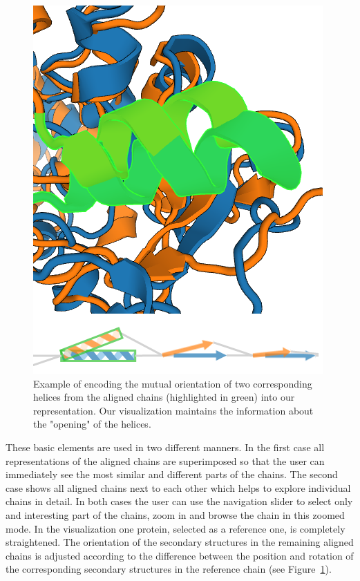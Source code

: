 \documentclass[twocolumn]{bmcart}%
\begin{document}
\begin{figure}[th]
  \centering
  \includegraphics[width=0.9\linewidth]{pics/orientation.png}
  \caption{Example of encoding the mutual orientation of two corresponding helices from the aligned chains (highlighted in green) into our representation. Our visualization maintains the information about the "opening" of the helices.}
  \label{fig:orientation}
\end{figure}

These basic elements are used in two different manners.
In the first case all representations of the aligned chains are superimposed so that the user can immediately see the most similar and different parts of the chains.
The second case shows all aligned chains next to each other which helps to explore individual chains in detail.
In both cases the user can use the navigation slider to select only and interesting part of the chains, zoom in and browse the chain in this zoomed mode.
In the visualization one protein, selected as a reference one, is completely straightened.
The orientation of the secondary structures in the remaining aligned chains is adjusted according to the difference between the position and rotation of the corresponding secondary structures in the reference chain (see Figure~\ref{fig:orientation}).
\end{document}
